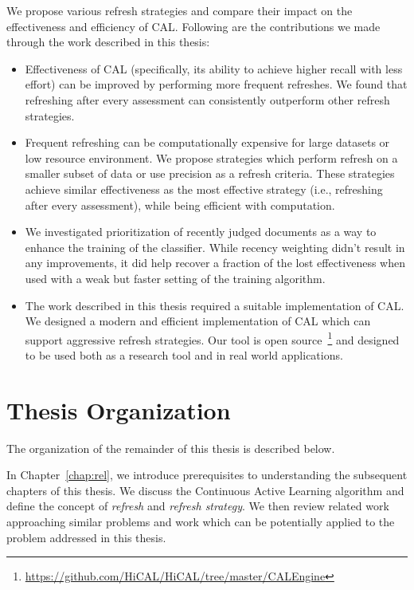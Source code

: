 We propose various refresh strategies and compare their impact on the
effectiveness and efficiency of CAL. Following are the contributions we made
through the work described in this thesis:
\begin{itemize}
    \item Effectiveness of CAL (specifically, its ability to achieve higher
        recall with less effort) can be improved by performing more frequent
        refreshes. We found that refreshing after every assessment can
        consistently outperform other refresh strategies.

    \item Frequent refreshing can be computationally expensive for large
        datasets or low resource environment. We propose strategies which perform
        refresh on a smaller subset of data or use precision as a refresh
        criteria. These strategies achieve similar effectiveness as the most
        effective strategy (i.e., refreshing after every assessment), while being
        efficient with computation.

    \item We investigated prioritization of recently judged documents as a way to
        enhance the training of the classifier. While recency weighting didn't result in any
        improvements, it did help recover a fraction of the lost effectiveness
        when used with a weak but faster setting of the training algorithm.

    \item  The work described in this thesis required a suitable implementation
        of CAL.  We designed a modern and efficient
        implementation of CAL which can support aggressive refresh strategies.
        Our tool is open
        source~\footnote{\url{https://github.com/HiCAL/HiCAL/tree/master/CALEngine}}
        and designed to be used both as a research tool and in real world
        applications.  
\end{itemize}


\section{Thesis Organization}

The organization of the remainder of this thesis is described below.

In Chapter~\ref{chap:rel}, we introduce prerequisites to understanding the
subsequent chapters of this thesis. We discuss the Continuous Active Learning
algorithm and define the concept of \textit{refresh} and \textit{refresh
strategy}. We then review related work approaching similar problems and work
which can be potentially applied to the problem addressed in this thesis.

